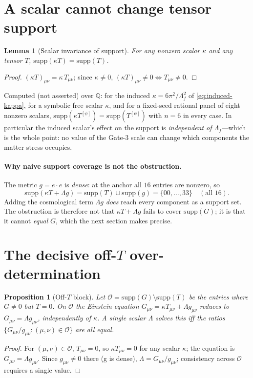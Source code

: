 \documentclass[11pt]{article}
\newtheorem{proposition}{Proposition}
\newtheorem{lemma}{Lemma}
\newcommand{\QQ}{\mathbb{Q}}
\newcommand{\supp}{\mathrm{supp}}
\newcommand{\eu}{e}
\begin{document}
\section{A scalar cannot change tensor support}\label{sec:scalar-inv}

\begin{lemma}[Scalar invariance of support]\label{lem:scalar-inv}
For any nonzero scalar $\kappa$ and any tensor $T$, $\supp(\kappa T)=\supp(T)$.
\end{lemma}
\begin{proof}
$(\kappa T)_{\mu\nu}=\kappa\,T_{\mu\nu}$; since $\kappa\neq0$, $(\kappa T)_{\mu\nu}\neq0
\iff T_{\mu\nu}\neq0$. \end{proof}

Computed (not asserted) over $\QQ$: for the induced $\kappa=6\pi^2/\Lambda_f^2$ of
\eqref{eq:induced-kappa}, for a symbolic free scalar $\kappa$, and for a fixed-seed rational
panel of eight nonzero scalars, $\supp(\kappa T^{[\psi]})=\supp(T^{[\psi]})$ with $n=6$ in every
case. In particular the induced scalar's effect on the support is \emph{independent of
$\Lambda_f$}---which is the whole point: no value of the Gate-3 scale can change which
components the matter stress occupies.

\paragraph{Why naive support coverage is not the obstruction.} The metric $g=\eu\!\cdot\!\eu$
is \emph{dense}: at the anchor all $16$ entries are nonzero, so
\begin{equation}
\supp(\kappa T+\Lambda g)=\supp(T)\cup\supp(g)=\{00,\dots,33\}\quad(\text{all }16).
\end{equation}
Adding the cosmological term $\Lambda g$ \emph{does} reach every component as a support set. The
obstruction is therefore not that $\kappa T+\Lambda g$ fails to cover $\supp(G)$; it is that it
cannot \emph{equal} $G$, which the next section makes precise.

\section{The decisive off-$T$ over-determination}\label{sec:offT}

\begin{proposition}[Off-$T$ block]\label{prop:offT}
Let $\mathcal{O}=\supp(G)\setminus\supp(T)$ be the entries where $G\neq0$ but $T=0$. On
$\mathcal{O}$ the Einstein equation $G_{\mu\nu}=\kappa T_{\mu\nu}+\Lambda g_{\mu\nu}$ reduces to
$G_{\mu\nu}=\Lambda g_{\mu\nu}$, independently of $\kappa$. A single scalar $\Lambda$ solves
this iff the ratios $\{G_{\mu\nu}/g_{\mu\nu}:(\mu,\nu)\in\mathcal{O}\}$ are all equal.
\end{proposition}
\begin{proof}
For $(\mu,\nu)\in\mathcal{O}$, $T_{\mu\nu}=0$, so $\kappa T_{\mu\nu}=0$ for any scalar
$\kappa$; the equation is $G_{\mu\nu}=\Lambda g_{\mu\nu}$. Since $g_{\mu\nu}\neq0$ there
(g is dense), $\Lambda=G_{\mu\nu}/g_{\mu\nu}$; consistency across $\mathcal{O}$ requires a single
value. \end{proof}
\end{document}
